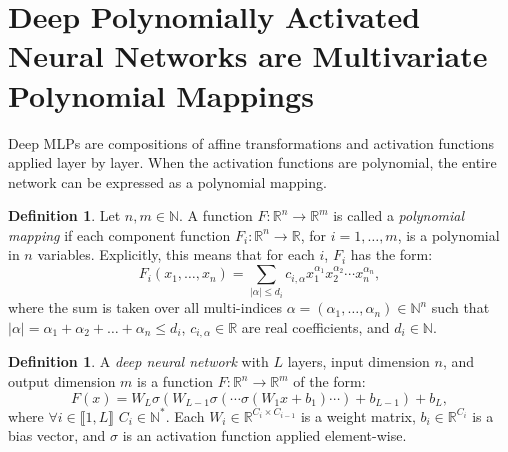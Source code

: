 \documentclass{article} %
\theoremstyle{plain}
\theoremstyle{definition}
\newtheorem{definition}[theorem]{Definition}
\theoremstyle{remark}
\begin{document}
\section{Deep Polynomially Activated Neural Networks are Multivariate Polynomial Mappings}
\label{appendix:mapping}
Deep MLPs are compositions of affine transformations and activation functions applied layer by layer. When the activation functions are polynomial, the entire network can be expressed as a polynomial mapping.
\begin{definition}
    Let $n, m \in \mathbb{N}$. A function $F: \mathbb{R}^n \to \mathbb{R}^m$ is called a \emph{polynomial mapping} if each component function $F_i: \mathbb{R}^n \to \mathbb{R}$, for $i = 1, \dots, m$, is a polynomial in $n$ variables. Explicitly, this means that for each $i$, $F_i$ has the form:
    \begin{equation}
        F_i(x_1, \dots, x_n) = \sum_{|\alpha| \leq d_i} c_{i, \alpha} x_1^{\alpha_1} x_2^{\alpha_2} \cdots x_n^{\alpha_n},
    \end{equation}
    where the sum is taken over all multi-indices $\alpha = (\alpha_1, \dots, \alpha_n) \in \mathbb{N}^n$ such that $|\alpha| = \alpha_1 + \alpha_2 + \dots + \alpha_n \leq d_i$, $c_{i, \alpha} \in \mathbb{R}$ are real coefficients, and $d_i \in \mathbb{N}$.
\end{definition}

\begin{definition}
    A \emph{deep neural network} with $L$ layers, input dimension $n$, and output dimension $m$ is a function $F: \mathbb{R}^n \to \mathbb{R}^m$ of the form:
    \begin{equation}
        F(x) = W_L \sigma ( W_{L-1} \sigma ( \cdots \sigma(W_1 x + b_1) \cdots ) + b_{L-1}) + b_L,
    \end{equation}
    where $\forall i \in \llbracket 1, L \rrbracket$ $C_i \in \mathbb{N}^*$. Each $W_i \in \mathbb{R}^{C_i \times C_{i-1}}$ is a weight matrix, $b_i \in \mathbb{R}^{C_i}$ is a bias vector, and $\sigma$ is an activation function applied element-wise.
\end{definition}
\end{document}
